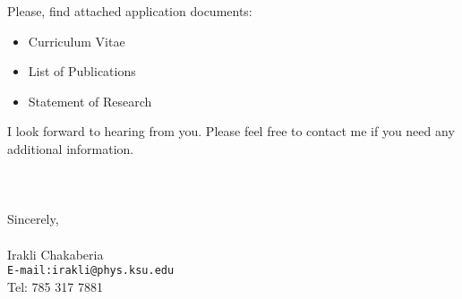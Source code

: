 \documentclass[a4paper]{article}
\begin{document}
Please, find attached application documents:
\begin{itemize}
\item Curriculum Vitae
\item List of Publications
\item Statement of Research
\end{itemize}



I look forward to hearing from you. Please feel free to contact me if you need any additional information.
\\
\\
\\
\\
Sincerely,\\
\\
Irakli Chakaberia\\
\texttt{E-mail:irakli@phys.ksu.edu}\\
Tel: 785 317 7881\\
\end{document}
